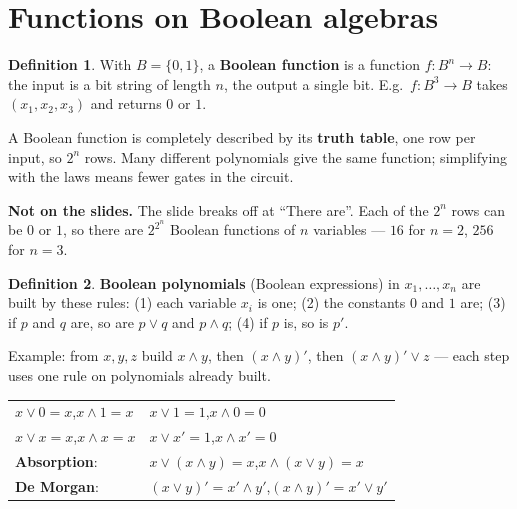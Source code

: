 \documentclass{fkt-notes}
\newcommand{\notslides}[1]{\par\noindent\textbf{Not on the slides.} #1\par}
\newcommand{\src}[1]{\par\noindent{\small\itshape Source: #1}\par\smallskip}
\newcommand{\kolman}[1]{\setcounter{section}{\numexpr#1-1\relax}}
\theoremstyle{definition}
\newtheorem*{defn}{Definition}
\begin{document}
\kolman{5}
\section{Functions on Boolean algebras}\src{Kolman 6.5}
%

\begin{defn}
  With $B=\{0,1\}$, a \textbf{Boolean function} is a function
  $f:B^n\to B$: the input is a bit string of length $n$, the output a
  single bit. E.g.\ $f:B^3\to B$ takes $(x_1,x_2,x_3)$ and returns $0$ or
  $1$.
\end{defn}
A Boolean function is completely described by its \textbf{truth table},
one row per input, so $2^n$ rows. Many different polynomials give the same function; simplifying with the laws means fewer gates in the circuit.
\notslides{The slide breaks off at ``There are''. Each of the $2^n$
  rows can be $0$ or $1$, so there are $2^{2^n}$ Boolean functions of $n$
  variables --- $16$ for $n=2$, $256$ for $n=3$.}

\begin{defn}
  \textbf{Boolean polynomials} (Boolean expressions) in $x_1,\dots,x_n$
  are built by these rules:
  (1) each variable $x_i$ is one;
  (2) the constants $0$ and $1$ are;
  (3) if $p$ and $q$ are, so are $p\vee q$ and $p\wedge q$;
  (4) if $p$ is, so is $p'$.
\end{defn}
Example: from $x,y,z$ build $x\wedge y$, then $(x\wedge y)'$, then
$(x\wedge y)'\vee z$ --- each step uses one rule on polynomials already
built.

\begin{rulebox}[title={Simplification rules}]
  \begin{tabular}{@{}l@{\qquad}l@{}}
    $x\vee0=x$,\quad $x\wedge1=x$   & $x\vee1=1$,\quad $x\wedge0=0$                           \\
    $x\vee x=x$,\quad $x\wedge x=x$ & $x\vee x'=1$,\quad $x\wedge x'=0$                       \\
    \textbf{Absorption}:            & $x\vee(x\wedge y)=x$,\quad $x\wedge(x\vee y)=x$         \\
    \textbf{De Morgan}:             & $(x\vee y)'=x'\wedge y'$,\quad $(x\wedge y)'=x'\vee y'$
  \end{tabular}
\end{rulebox}
\end{document}
